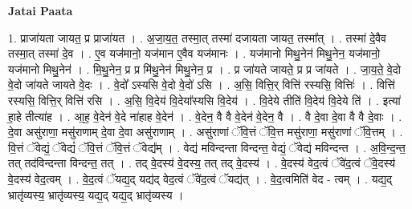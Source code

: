 \documentclass[17pt]{extarticle}
\begin{document}
\textbf{Jatai Paata} \newline

1. प्राजा॑यता जायत॒ प्र प्राजा॑यत । . अ॒जा॒य॒त॒ तस्मा॒त् तस्मा॑ दजायता जायत॒ तस्मा᳚त् । . तस्मा॑ दे॒वैव तस्मा॒त् तस्मा॑ दे॒व । . ए॒व यज॑मानो॒ यज॑मान ए॒वैव यज॑मानः । . यज॑मानो मिथु॒नेन॑ मिथु॒नेन॒ यज॑मानो॒ यज॑मानो मिथु॒नेन॑ । . मि॒थु॒नेन॒ प्र प्र मि॑थु॒नेन॑ मिथु॒नेन॒ प्र । . प्र जा॑यते जायते॒ प्र प्र जा॑यते । . जा॒य॒ते॒ वे॒दो वे॒दो जा॑यते जायते वे॒दः । . वे॒दो᳚ ऽस्यसि वे॒दो वे॒दो॑ ऽसि । . अ॒सि॒ वित्ति॒र् वित्ति॑ रस्यसि॒ वित्तिः॑ । . वित्ति॑ रस्यसि॒ वित्ति॒र् वित्ति॑ रसि । . अ॒सि॒ वि॒देय॑ वि॒देया᳚स्यसि वि॒देय॑ । . वि॒देये तीति॑ वि॒देय॑ वि॒देये ति॑ । . इत्या॑ हा॒हे तीत्या॑ह । . आ॒ह॒ वे॒देन॑ वे॒दे ना॑हाह वे॒देन॑ । . वे॒देन॒ वै वै वे॒देन॑ वे॒देन॒ वै । . वै दे॒वा दे॒वा वै वै दे॒वाः । . दे॒वा असु॑राणा॒ मसु॑राणाम् दे॒वा दे॒वा असु॑राणाम् । . असु॑राणां ॅवि॒त्तं ॅवि॒त्त मसु॑राणा॒ मसु॑राणां ॅवि॒त्तम् । . वि॒त्तं ॅवेद्यं॒ ॅवेद्यं॑ ॅवि॒त्तं ॅवि॒त्तं ॅवेद्य᳚म् । . वेद्य॑ मविन्दन्ता विन्दन्त॒ वेद्यं॒ ॅवेद्य॑ मविन्दन्त । . अ॒वि॒न्द॒न्त॒ तत् तद॑विन्दन्ता विन्दन्त॒ तत् । . तद् वे॒दस्य॑ वे॒दस्य॒ तत् तद् वे॒दस्य॑ । . वे॒दस्य॑ वेद॒त्वं ॅवे॑द॒त्वं ॅवे॒दस्य॑ वे॒दस्य॑ वेद॒त्वम् । . वे॒द॒त्वं ॅयद्य॒द् यद्य॑द् वेद॒त्वं ॅवे॑द॒त्वं ॅयद्य॑त् । . वे॒द॒त्वमिति॑ वेद - त्वम् । . यद्य॒द् भ्रातृ॑व्यस्य॒ भ्रातृ॑व्यस्य॒ यद्य॒द् यद्य॒द् भ्रातृ॑व्यस्य । \newline
\end{document}
